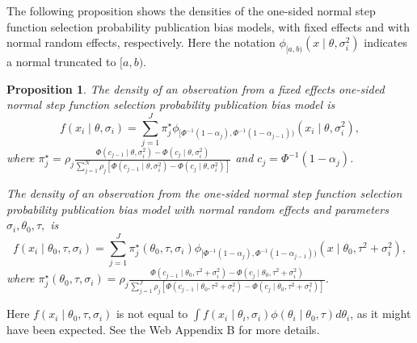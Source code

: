 \documentclass[useAMS,usenatbib,referee]{biom}
\newtheorem{prop}[theorem]{Proposition}
\begin{document}
The following proposition shows the densities of the one-sided normal step function selection probability publication bias models, with fixed effects and with normal random effects, respectively. Here the notation $\phi_{[a,b)}(x\mid\theta,\sigma_i^2)$ indicates a normal truncated to $[a,b)$.
\begin{prop}
\label{prop:One-sided normal discrete probability vector publication bias model-1}
The density of an observation from a fixed effects one-sided normal step function selection probability publication bias model is
\begin{equation}\label{eq:Fixed effects, publication bias}
f(x_{i}\mid\theta,\sigma_{i}) = \sum_{j=1}^{J}\pi_{j}^\star\phi_{[\Phi^{-1}(1-\alpha_{j}),\Phi^{-1}(1-\alpha_{j-1}))}(x_{i}\mid\theta,\sigma_{i}^2),
\end{equation}
where $\pi_{j}^{\star}=\rho_{j}\frac{\Phi(c_{j-1}\mid\theta,\sigma_{i}^2)-\Phi(c_{j}\mid\theta,\sigma_{i}^2)}{\sum_{j=1}^{N}\rho_{j}\left[\Phi(c_{j-1}\mid\theta,\sigma_{i}^2)-\Phi(c_{j}\mid\theta,\sigma_{i}^2)\right]}$ and $c_{j}=\Phi^{-1}(1-\alpha_{j})$.

The density of an observation from the one-sided normal step function selection probability publication bias model with normal random effects and parameters $\sigma_{i},\theta_{0},\tau,$ is
\begin{equation}\label{eq:Random effects, publication bias}
f(x_i\mid\theta_{0},\tau,\sigma_{i})=\sum_{j=1}^{J}\pi_{j}^{\star}(\theta_0,\tau,\sigma_{i})\phi_{[\Phi^{-1}(1-\alpha_{j}),\Phi^{-1}(1-\alpha_{j-1}))}(x\mid\theta_{0},\tau^{2}+\sigma_{i}^{2}),
\end{equation}
where $\pi_{j}^{\star}(\theta_0,\tau,\sigma_{i})=\rho_{j}\frac{\Phi(c_{j-1}\mid\theta_{0},\tau^{2}+\sigma_{i}^{2})-\Phi(c_{j}\mid\theta_{0},\tau^{2}+\sigma_{i}^{2})}{\sum_{j=1}^{J}\rho_{j}\left[\Phi(c_{j-1}\mid\theta_{0},\tau^{2}+\sigma_{i}^{2})-\Phi(c_{j}\mid\theta_{0},\tau^{2}+\sigma_{i}^{2})\right]}$.
\end{prop}

Here $f(x_i\mid\theta_{0},\tau,\sigma_i)$ is not equal to $\int f(x_{i}\mid\theta_{i},\sigma_{i})\phi(\theta_{i}\mid\theta_{0},\tau)d\theta_{i}$, as it might have been expected. See the Web Appendix B for more details.
\end{document}
